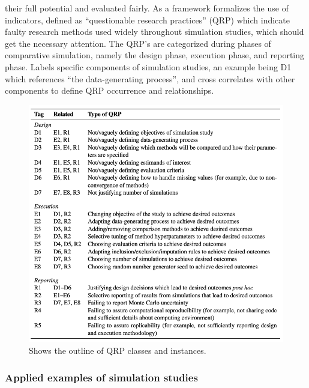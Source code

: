 their full potential and evaluated fairly. As a framework \parencite{pawel_pitfalls_2024} formalizes the use of indicators, defined as “questionable research practices” (QRP) which indicate faulty research methods used widely throughout simulation studies, which should get the necessary attention. The QRP’s are categorized during phases of comparative simulation, namely the design phase, execution phase, and reporting phase. \parencite{pawel_pitfalls_2024} Labels specific components of simulation studies, an example being D1 which references “the data-generating process”, and cross correlates with other components to define QRP occurrence and relationships.

\begin{figure}[h]
	\includegraphics[scale=0.5]{Figures/QRPSUMMARY.png}
	\caption{Shows the outline of QRP classes and instances. \parencite{pawel_pitfalls_2024}}
\end{figure}


\subsubsection{Applied examples of simulation studies}

